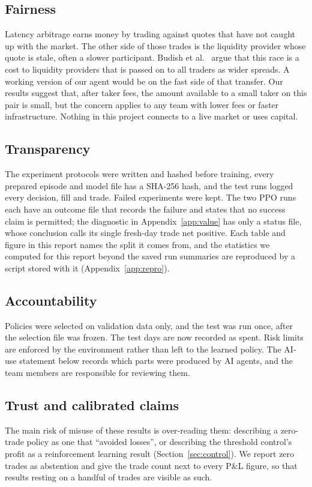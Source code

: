 \documentclass[12pt,a4paper]{article}
\begin{document}
\subsection{Fairness}
Latency arbitrage earns money by trading against quotes that have not caught up with the
market. The other side of those trades is the liquidity provider whose quote is stale, often
a slower participant. Budish et al.~\cite{budish} argue that this race is a cost to
liquidity providers that is passed on to all traders as wider spreads. A working version of
our agent would be on the fast side of that transfer. Our results suggest that, after taker
fees, the amount available to a small taker on this pair is small, but the concern applies
to any team with lower fees or faster infrastructure. Nothing in this project connects to a
live market or uses capital.

\subsection{Transparency}
The experiment protocols were written and hashed before training, every prepared episode and
model file has a SHA-256 hash, and the test runs logged every decision, fill and trade.
Failed experiments were kept. The two PPO runs each have an outcome file that records the
failure and states that no success claim is permitted; the diagnostic in
Appendix~\ref{app:value} has only a status file, whose conclusion calls its single fresh-day
trade net positive. Each table and figure in this report names the split it comes from, and
the statistics we computed for this report beyond the saved run summaries are reproduced by a
script stored with it (Appendix~\ref{app:repro}).

\subsection{Accountability}
Policies were selected on validation data only, and the test was run once, after the
selection file was frozen. The test days are now recorded as spent. Risk limits are enforced
by the environment rather than left to the learned policy. The AI-use statement below
records which parts were produced by AI agents, and the team members are responsible for
reviewing them.

\subsection{Trust and calibrated claims}
The main risk of misuse of these results is over-reading them: describing a zero-trade
policy as one that ``avoided losses'', or describing the threshold control's profit as a
reinforcement learning result (Section~\ref{sec:control}). We report zero trades as
abstention and give the trade count next to every P\&L figure, so that results resting on a
handful of trades are visible as such.
\end{document}
